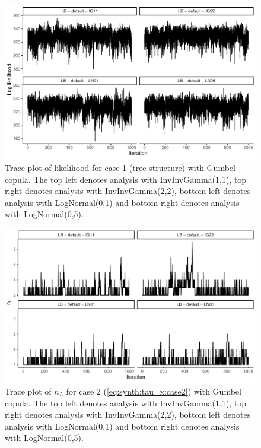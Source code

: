 \documentclass{amsart}
\begin{document}
\begin{figure}
	\centering
	\includegraphics[width = 0.75\linewidth]{trace_case1_gumbel_like.pdf}
	\caption{Trace plot of likelihood for case 1 (tree structure) with Gumbel copula. The top left denotes analysis with InvInvGamma(1,1), top right denotes analysis with InvInvGamma(2,2), bottom left denotes analysis with LogNormal(0,1) and bottom right denotes analysis with LogNormal(0,5).}
	\label{fig:case1:gumbel:like}
\end{figure}

\begin{figure}
	\centering
	\includegraphics[width = 0.75\linewidth]{trace_case2_gumbel_nterm.pdf}
	\caption{Trace plot of $n_L$ for case 2 (\cref{eq:synth:tau_x:case2}) with Gumbel copula. The top left denotes analysis with InvInvGamma(1,1), top right denotes analysis with InvInvGamma(2,2), bottom left denotes analysis with LogNormal(0,1) and bottom right denotes analysis with LogNormal(0,5).}
	\label{fig:case2:gumbel:nterm}
\end{figure}
\end{document}
